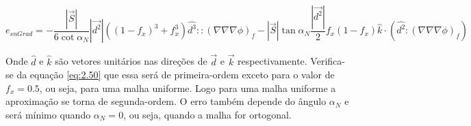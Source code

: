 \begin{equation}
    e_{snGrad} = -\frac{|\vec{S}|}{6 \cot{\alpha_N}} |\vec{d^2}| ((1-f_x)^3 + f_x^3)\hat{d^3}:: (\nabla \nabla \nabla \phi)_f - |\vec{S}| \tan{\alpha_N} \frac{|\vec{d^2}|}{2}f_x(1-f_x)\hat{k} \cdot (\hat{d^2}:(\nabla \nabla \nabla \phi)_f)
    \label{eq:2.50}
\end{equation}

Onde $\hat{d}$ e $\hat{k}$ são vetores unitários nas direções de $\vec{d}$ e $\vec{k}$ respectivamente. Verifica-se da equação \ref{eq:2.50} que essa será de primeira-ordem exceto para o valor de $f_x=0.5$, ou seja, para uma malha uniforme. Logo para uma malha uniforme a aproximação se torna de segunda-ordem. O erro também depende do ângulo $\alpha_N$ e será mínimo quando $\alpha_N=0$, ou seja, quando a malha for ortogonal.